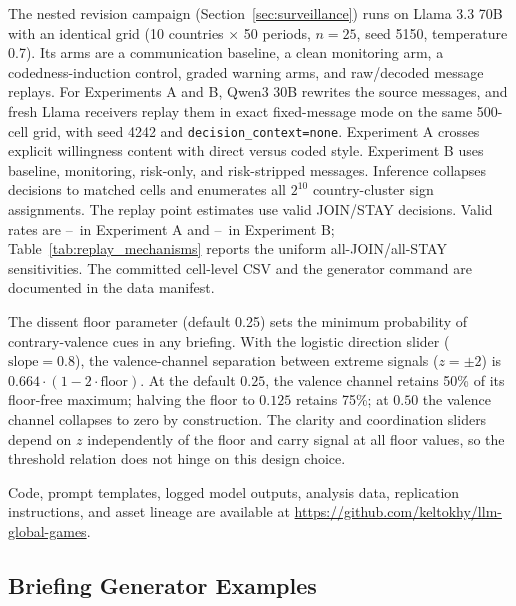 \documentclass[12pt]{article}
\newif\ifanonymous
\begin{document}
The nested revision campaign (Section~\ref{sec:surveillance}) runs on Llama 3.3 70B with an identical grid (10 countries $\times$ 50 periods, $n = 25$, seed 5150, temperature 0.7). Its arms are a communication baseline, a clean monitoring arm, a codedness-induction control, graded warning arms, and raw/decoded message replays. For Experiments A and B, Qwen3 30B rewrites the source messages, and fresh Llama receivers replay them in exact fixed-message mode on the same 500-cell grid, with seed 4242 and \texttt{decision\_context=none}. Experiment A crosses explicit willingness content with direct versus coded style. Experiment B uses baseline, monitoring, risk-only, and risk-stripped messages. Inference collapses decisions to matched cells and enumerates all $2^{10}$ country-cluster sign assignments. The replay point estimates use valid JOIN/STAY decisions. Valid rates are \ReplayWillingDirectValidPct--\ReplayNoWillingCodedValidPct\ in Experiment A and \ReplayRiskOnlyValidPct--\ReplayBaselineValidPct\ in Experiment B; Table~\ref{tab:replay_mechanisms} reports the uniform all-JOIN/all-STAY sensitivities. The committed cell-level CSV and the generator command are documented in the data manifest.

The dissent floor parameter (default 0.25) sets the minimum probability of contrary-valence cues in any briefing. With the logistic direction slider ($\text{slope} = 0.8$), the valence-channel separation between extreme signals ($z = \pm 2$) is $0.664 \cdot (1 - 2\cdot\text{floor})$. At the default $0.25$, the valence channel retains 50\% of its floor-free maximum; halving the floor to $0.125$ retains 75\%; at $0.50$ the valence channel collapses to zero by construction. The clarity and coordination sliders depend on $z$ independently of the floor and carry signal at all floor values, so the threshold relation does not hinge on this design choice.

\ifanonymous
Code, prompt templates, logged model outputs, analysis data, replication instructions, and asset lineage are available in the de-identified replication archive submitted with the manuscript.
\else
Code, prompt templates, logged model outputs, analysis data, replication instructions, and asset lineage are available at \url{https://github.com/keltokhy/llm-global-games}.
\fi

\subsection{Briefing Generator Examples} \label{sec:briefing_examples}
\end{document}
